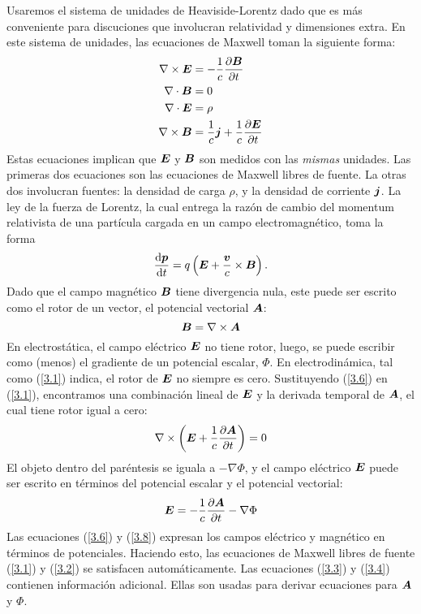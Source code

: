 Usaremos el sistema de unidades de Heaviside-Lorentz dado que es más conveniente para discuciones que involucran relatividad y dimensiones extra. En este sistema de unidades, las ecuaciones de Maxwell toman la siguiente forma:
\begin{align}
    \label{3.1}\nabla\times\vb*{E}&=-\frac{1}{c}\pdv{\vb*{B}}{t}\\
    \label{3.2}\nabla\cdot\vb*{B}&=0\\
    \label{3.3}\nabla\cdot\vb*{E}&=\rho\\
    \label{3.4}\nabla\times\vb*{B}&=\frac{1}{c}\vb*{j}+\frac{1}{c}\pdv{\vb*{E}}{t}
\end{align}
Estas ecuaciones implican que $\vb*{E}$ y $\vb*{B}$ son medidos con las \textit{mismas} unidades. Las primeras dos ecuaciones son las ecuaciones de Maxwell libres de fuente. La otras dos involucran fuentes: la densidad de carga $\rho$, y la densidad de corriente $\vb*{j}$. La ley de la fuerza de Lorentz, la cual entrega la razón de cambio del momentum relativista de una partícula cargada en un campo electromagnético, toma la forma
\begin{equation}\label{3.5}
    \dv{\vb*{p}}{t}=q\left(\vb*{E}+\frac{\vb*{v}}{c}\times\vb*{B}\right).
\end{equation}
Dado que el campo magnético $\vb*{B}$ tiene divergencia nula, este puede ser escrito como el rotor de un vector, el potencial vectorial $\vb*{A}$:
\begin{equation}\label{3.6}
    \vb*{B}=\nabla\times \vb*{A}
\end{equation}
En electrostática, el campo eléctrico $\vb*{E}$ no tiene rotor, luego, se puede escribir como (menos) el gradiente de un potencial escalar, $\Phi$. En electrodinámica, tal como (\ref{3.1}) indica, el rotor de $\vb*{E}$ no siempre es cero. Sustituyendo (\ref{3.6}) en (\ref{3.1}), encontramos una combinación lineal de $\vb*{E}$ y la derivada temporal de $\vb*{A}$, el cual tiene rotor igual a cero:
\begin{equation}
    \nabla\times\left(\vb*{E}+\frac{1}{c}\pdv{\vb*{A}}{t}\right)=0
\end{equation}
El objeto dentro del paréntesis se iguala a $-\nabla\Phi$, y el campo eléctrico $\vb*{E}$ puede ser escrito en términos del potencial escalar y el potencial vectorial:
\begin{equation}\label{3.8}
    \vb*{E}=-\frac{1}{c}\pdv{\vb*{A}}{t}-\nabla\Phi
\end{equation}
Las ecuaciones (\ref{3.6}) y (\ref{3.8}) expresan los campos eléctrico y magnético en términos de potenciales. Haciendo esto, las ecuaciones de Maxwell libres de fuente (\ref{3.1}) y (\ref{3.2}) se satisfacen automáticamente. Las ecuaciones (\ref{3.3}) y (\ref{3.4}) contienen información adicional. Ellas son usadas para derivar ecuaciones para $\vb*{A}$ y $\Phi$.

